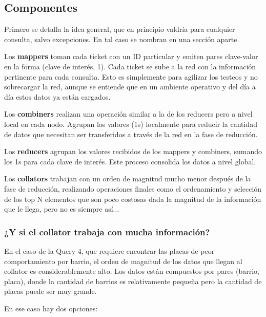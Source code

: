 \documentclass[a4paper,12pt]{article}
\begin{document}
	\subsection{Componentes}
	
	Primero se detalla la idea general, que en principio valdría para cualquier consulta, salvo excepciones. En tal caso se nombran en una sección aparte.
	
	\bigskip
	
	Los \textbf{mappers} toman cada ticket con un ID particular y emiten pares clave-valor en la forma (clave de interés, 1). Cada ticket se sube a la red con la información pertinente para cada consulta. Esto es simplemente para agilizar los testeos y no sobrecargar la red, aunque se entiende que en un ambiente operativo y del día a día estos datos ya están cargados.
	
	\bigskip
	
	Los \textbf{combiners} realizan una operación similar a la de los reducers pero a nivel local en cada nodo. Agrupan los valores (1s) localmente para reducir la cantidad de datos que necesitan ser transferidos a través de la red en la fase de reducción.
	
	\bigskip
	
	Los \textbf{reducers} agrupan los valores recibidos de los mappers y combiners, sumando los 1s para cada clave de interés. Este proceso consolida los datos a nivel global.
	
	\bigskip
	
	Los \textbf{collators} trabajan con un orden de magnitud mucho menor después de la fase de reducción, realizando operaciones finales como el ordenamiento y selección de los top N elementos que son poco costosas dada la magnitud de la información que le llega, pero no es siempre así...
	
	\subsubsection{¿Y si el collator trabaja con mucha información?}
	
	En el caso de la Query 4, que requiere encontrar las placas de peor comportamiento por barrio, el orden de magnitud de los datos que llegan al collator es considerablemente alto. Los datos están compuestos por pares (barrio, placa), donde la cantidad de barrios es relativamente pequeña pero la cantidad de placas puede ser muy grande.
	
	\bigskip
	En ese caso hay dos opciones: 
	
\end{document}
